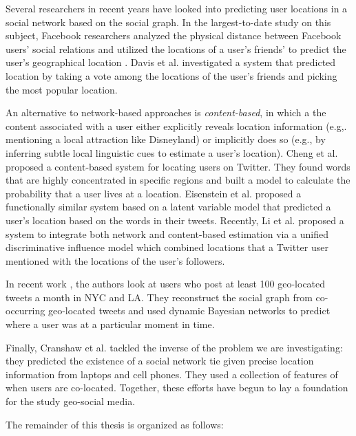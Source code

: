 Several researchers in recent years have looked into predicting user locations
in a social network based on the social graph.
%
In the largest-to-date study on this subject, Facebook researchers analyzed the
physical distance between Facebook users' social relations and utilized the
locations of a user's friends' to predict the user's geographical location
\cite{backstrom2010find}.
%
Davis et al. \cite{davis2011infer} investigated a system that predicted
location by taking a vote among the locations of the user's friends and picking
the most popular location.

An alternative to network-based approaches is \textit{content-based}, in which
a the content associated with a user either explicitly reveals location
information (e.g,. mentioning a local attraction like Disneyland) or implicitly
does so (e.g., by inferring subtle local linguistic cues to estimate a user's
location).
%
Cheng et al. \cite{cheng2010you} proposed a content-based system for locating
users on Twitter.
%
They found words that are highly concentrated in specific regions and built a
model to calculate the probability that a user lives at a location.
%
Eisenstein et al. \cite{eisenstein2010latent} proposed a functionally similar
system based on a latent variable model that predicted a user's location based
on the words in their tweets.
%
Recently, Li et al. \cite{li2012towards} proposed a system to integrate both
network and content-based estimation via a unified discriminative influence
model which combined locations that a Twitter user mentioned with the locations
of the user's followers.

In recent work \cite{sadilek2012finding}, the authors look at users who post at
least 100 geo-located tweets a month in NYC and LA.
%
They reconstruct the social graph from co-occurring geo-located tweets and used
dynamic Bayesian networks to predict where a user was at a particular moment in
time.

Finally, Cranshaw et al. \cite{cranshaw2010bridging} tackled the inverse of the
problem we are investigating: they predicted the existence of a social network
tie given precise location information from laptops and cell phones.
%
They used a collection of features of when users are co-located.
%
Together, these efforts have begun to lay a foundation for the study geo-social media.



The remainder of this thesis is organized as follows:

